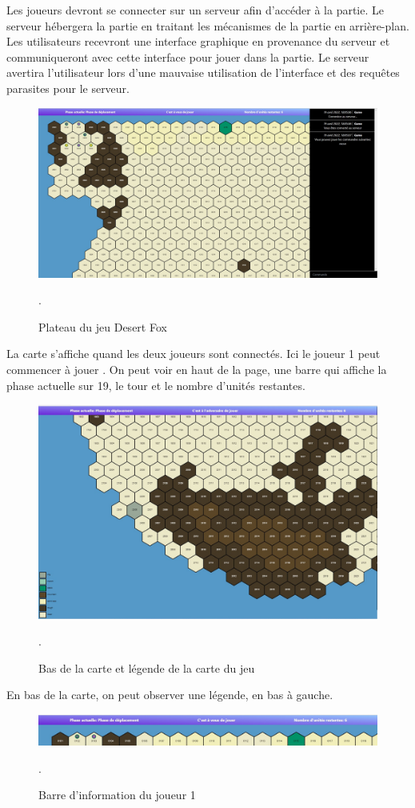 Les joueurs devront se connecter sur un serveur afin d'accéder à la partie. Le serveur hébergera la partie en traitant les mécanismes de la partie en arrière-plan. Les utilisateurs recevront une interface graphique en provenance du serveur et communiqueront avec cette interface pour jouer dans la partie.
Le serveur avertira l'utilisateur lors d'une mauvaise utilisation de l'interface et des requêtes parasites pour le serveur.


\begin{figure}[H]
\centering
\includegraphics[scale=0.35]{data/plateau_du_jeu.jpg}
\caption{Plateau du jeu Desert Fox}.
\end{figure}

La carte s'affiche quand les deux joueurs sont connectés. Ici le joueur 1 peut commencer à jouer
. On peut voir en haut de la page, une barre qui affiche la phase actuelle sur 19, le tour  et le nombre d'unités restantes.


\begin{figure}[H]
\centering
\includegraphics[scale=0.35]{data/justification2.jpg}
\caption{Bas de la carte et légende de la carte du jeu}.
\end{figure}
En bas de la carte, on peut observer une légende, en bas à gauche.\\
\begin{figure}[H]
\centering
\includegraphics[scale=0.4]{data/player_1_acces.jpg}
\caption{Barre d'information du joueur 1}.
\end{figure}

